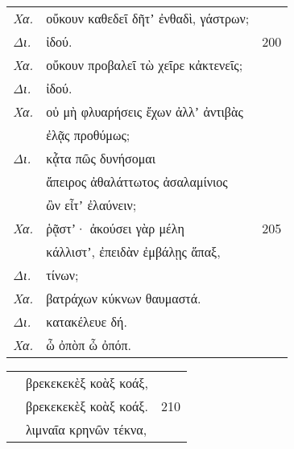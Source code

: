 \documentclass[13pt]{article}
\begin{document}
\begin{greek}
\begin{spacing}{1.5}
\begin{tabularx}{\textwidth}{@{}lXr@{}}

    \textit{Χα.} & οὔκουν καθεδεῖ δῆτʼ ἐνθαδὶ, γάστρων; & \\
    \textit{Δι.} & \hspace{16em} ἰδού. & 200 \\
    \textit{Χα.} & οὔκουν προβαλεῖ τὼ χεῖρε κἀκτενεῖς; &  \\
    \textit{Δι.} & \hspace{16em} ἰδού. &  \\
    \textit{Χα.} & οὐ μὴ φλυαρήσεις ἔχων ἀλλʼ ἀντιβὰς &  \\
    & ἐλᾷς προθύμως; &  \\
    \textit{Δι.} & \hspace{7em}κᾆτα πῶς δυνήσομαι &  \\
    & ἄπειρος ἀθαλάττωτος ἀσαλαμίνιος &  \\
    & ὢν εἶτʼ ἐλαύνειν; & \\
    \textit{Χα.} & \hspace{7em} ῥᾷστʼ· ἀκούσει γὰρ μέλη & 205 \\
    & κάλλιστʼ, ἐπειδὰν ἐμβάλῃς ἅπαξ, &  \\
    \textit{Δι.} & \hspace{14em} τίνων; &  \\
    \textit{Χα.} & βατράχων κύκνων θαυμαστά. &  \\
    \textit{Δι.} & \hspace{13em}κατακέλευε δή. &  \\
    \textit{Χα.} & ὦ ὀπὸπ ὦ ὀπόπ. &  \\
\end{tabularx}

\noindent\textit{\MakeUppercase{}}

\begin{tabularx}{\textwidth}{@{}lXr@{}}
    & βρεκεκεκὲξ κοὰξ κοάξ, &  \\
    & βρεκεκεκὲξ κοὰξ κοάξ. & 210 \\
    & λιμναῖα κρηνῶν τέκνα, &  \\

\end{tabularx}

\end{spacing}

\newpage


\end{greek}
\end{document}
